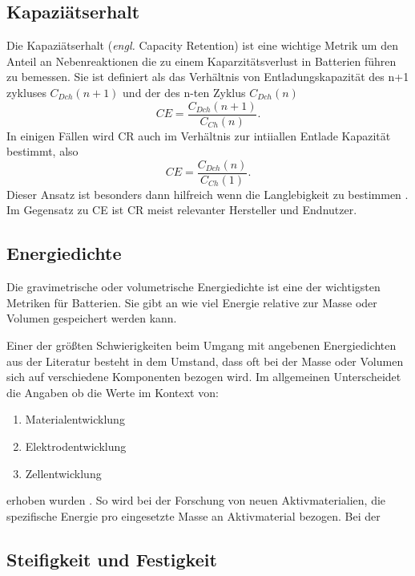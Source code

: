 \subsection{Kapaziätserhalt}
Die Kapaziätserhalt (\textit{engl.} Capacity Retention) ist eine wichtige Metrik um den Anteil an Nebenreaktionen die zu einem Kaparzitätsverlust in Batterien führen zu bemessen. Sie ist definiert als das Verhältnis von Entladungskapazität des n+1 zykluses $C_{Dch}(n+1)$ und der des n-ten Zyklus $C_{Dch}(n)$ 
\begin{equation}
    CE = \frac{C_{Dch}(n+1)}{C_{Ch}(n)}.
\end{equation}
In einigen Fällen wird CR auch im Verhältnis zur intiiallen Entlade Kapazität bestimmt, also
\begin{equation}
    CE = \frac{C_{Dch}(n)}{C_{Ch}(1)}.
\end{equation}
Dieser Ansatz ist besonders dann hilfreich wenn die Langlebigkeit zu bestimmen \cite{Tornheim2020}.
Im Gegensatz zu CE ist CR meist relevanter Hersteller und Endnutzer.



\subsection{Energiedichte}
Die gravimetrische oder volumetrische Energiedichte ist eine der wichtigsten Metriken für Batterien. Sie gibt an wie viel Energie relative zur Masse oder Volumen gespeichert werden kann. 

Einer der größten Schwierigkeiten beim Umgang mit angebenen Energiedichten aus der Literatur besteht in dem Umstand, dass oft bei der Masse oder Volumen sich auf verschiedene Komponenten bezogen wird. Im allgemeinen Unterscheidet die Angaben ob die Werte im Kontext von:
\begin{enumerate}
	\item Materialentwicklung
	\item Elektrodentwicklung
	\item Zellentwicklung
\end{enumerate}
erhoben wurden \cite{Son2021}.
So wird bei der Forschung von neuen Aktivmaterialien, die spezifische Energie pro eingesetzte Masse an Aktivmaterial bezogen. Bei der 

\subsection{Steifigkeit und Festigkeit}
